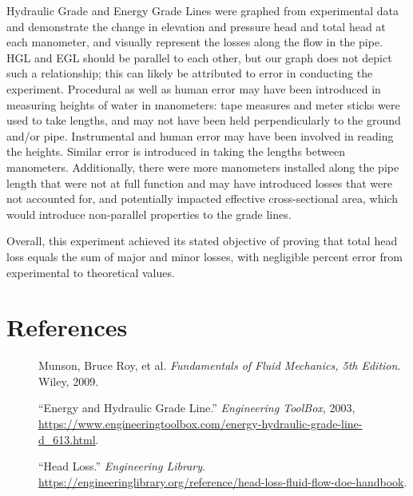\documentclass{article}
\begin{document}
\par Hydraulic Grade and Energy Grade Lines were graphed from experimental data and demonstrate the change in elevation and pressure head and total head at each manometer, and visually represent the losses along the flow in the pipe. HGL and EGL should be parallel to each other, but our graph does not depict such a relationship; this can likely be attributed to error in conducting the experiment. Procedural as well as human error may have been introduced in measuring heights of water in manometers: tape measures and meter sticks were used to take lengths, and may not have been held perpendicularly to the ground and/or pipe. Instrumental and human error may have been involved in reading the heights. Similar error is introduced in taking the lengths between manometers. Additionally, there were more manometers installed along the pipe length that were not at full function and may have introduced losses that were not accounted for, and potentially impacted effective cross-sectional area, which would introduce non-parallel properties to the grade lines. \\
\par Overall, this experiment achieved its stated objective of proving that total head loss equals the sum of major and minor losses, with negligible percent error from experimental to theoretical values. 
\newpage
\section{References}
\begin{description}
    \item[] Munson, Bruce Roy, et al. \emph{Fundamentals of Fluid Mechanics, 5th Edition}. Wiley, 2009.  
    \item[] ``Energy and Hydraulic Grade Line.'' \emph{Engineering ToolBox}, 2003, \url{https://www.engineeringtoolbox.com/energy-hydraulic-grade-line-d_613.html}.
    \item[] ``Head Loss.'' \emph{Engineering Library}. \url{https://engineeringlibrary.org/reference/head-loss-fluid-flow-doe-handbook}.
\end{description}
\newpage
\end{document}
